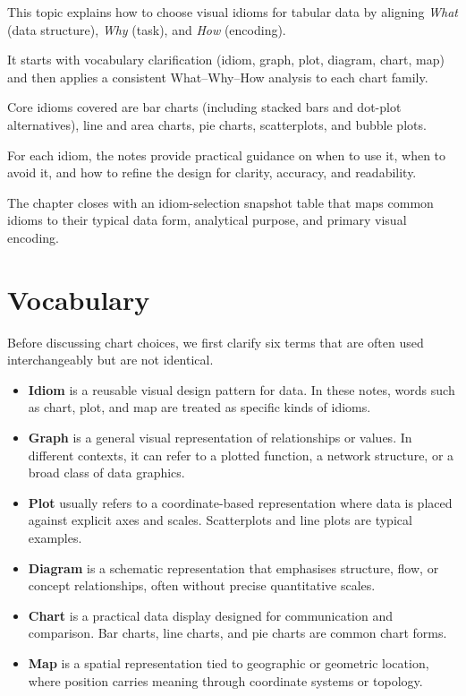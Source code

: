 
\begin{topicsummary}
    \item This topic explains how to choose visual idioms for tabular data by aligning \textit{What} (data structure), \textit{Why} (task), and \textit{How} (encoding).
    \item It starts with vocabulary clarification (idiom, graph, plot, diagram, chart, map) and then applies a consistent What--Why--How analysis to each chart family.
    \item Core idioms covered are bar charts (including stacked bars and dot-plot alternatives), line and area charts, pie charts, scatterplots, and bubble plots.
    \item For each idiom, the notes provide practical guidance on when to use it, when to avoid it, and how to refine the design for clarity, accuracy, and readability.
    \item The chapter closes with an idiom-selection snapshot table that maps common idioms to their typical data form, analytical purpose, and primary visual encoding.
\end{topicsummary}

\section{Vocabulary}
Before discussing chart choices, we first clarify six terms that are often used interchangeably but are not identical.

\begin{itemize}
    \item \textbf{Idiom} is a reusable visual design pattern for data. In these notes, words such as chart, plot, and map are treated as specific kinds of idioms.
    \item \textbf{Graph} is a general visual representation of relationships or values. In different contexts, it can refer to a plotted function, a network structure, or a broad class of data graphics.
    \item \textbf{Plot} usually refers to a coordinate-based representation where data is placed against explicit axes and scales. Scatterplots and line plots are typical examples.
    \item \textbf{Diagram} is a schematic representation that emphasises structure, flow, or concept relationships, often without precise quantitative scales.
    \item \textbf{Chart} is a practical data display designed for communication and comparison. Bar charts, line charts, and pie charts are common chart forms.
    \item \textbf{Map} is a spatial representation tied to geographic or geometric location, where position carries meaning through coordinate systems or topology.
\end{itemize}

